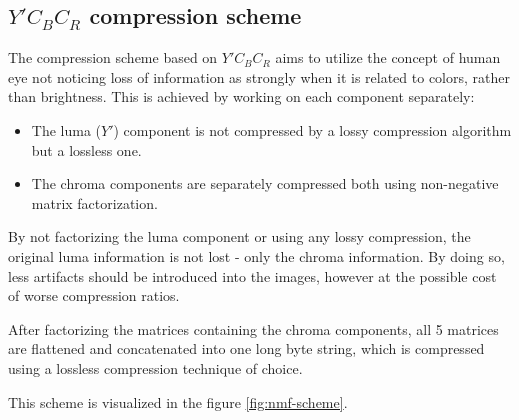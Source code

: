 \documentclass[thesis=M,english]{FITthesis}[2012/10/20]
\begin{document}
\subsection{$Y'C_BC_R$ compression scheme}
The compression scheme based on $Y'C_BC_R$ aims to utilize the concept
of human eye not noticing loss of information as strongly when it is related
to colors, rather than brightness. This is achieved by working on each component
separately:

\begin{itemize}
  \item The luma ($Y'$) component is not compressed by a lossy compression algorithm but
        a lossless one.
  \item The chroma components are separately compressed both using non-negative
   matrix factorization.
\end{itemize}

By not factorizing the luma component or using any lossy compression, the original luma
information is not lost - only the chroma information. By doing so, less artifacts should
be introduced into the images, however at the possible cost of worse compression ratios.

After factorizing the matrices containing the chroma components, all 5 matrices are flattened
and concatenated into one long byte string, which is compressed using a lossless compression
technique of choice.

This scheme is visualized in the figure \ref{fig:nmf-scheme}.
\end{document}
